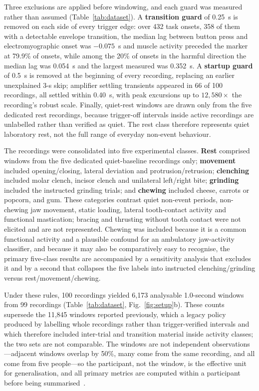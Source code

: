 \documentclass[pdflatex,sn-nature,iicol]{sn-jnl}
\begin{document}
Three exclusions are applied before windowing, and each guard was measured rather than assumed (Table~\ref{tab:dataset}). A \textbf{transition guard} of 0.25~s is removed on each side of every trigger edge: over 432 task onsets, 358 of them with a detectable envelope transition, the median lag between button press and electromyographic onset was $-0.075$~s and muscle activity preceded the marker at 79.9\% of onsets, while among the 20\% of onsets in the harmful direction the median lag was 0.054~s and the largest measured was 0.352~s. A \textbf{startup guard} of 0.5~s is removed at the beginning of every recording, replacing an earlier unexplained 3-s skip; amplifier settling transients appeared in 66 of 100 recordings, all settled within 0.40~s, with peak excursions up to $12{,}580\times$ the recording's robust scale. Finally, quiet-rest windows are drawn only from the five dedicated rest recordings, because trigger-off intervals inside active recordings are unlabelled rather than verified as quiet. The rest class therefore represents quiet laboratory rest, not the full range of everyday non-event behaviour.

The recordings were consolidated into five experimental classes. \textbf{Rest} comprised windows from the five dedicated quiet-baseline recordings only; \textbf{movement} included opening/closing, lateral deviation and protrusion/retrusion; \textbf{clenching} included molar clench, incisor clench and unilateral left/right bite; \textbf{grinding} included the instructed grinding trials; and \textbf{chewing} included cheese, carrots or popcorn, and gum. These categories contrast quiet non-event periods, non-chewing jaw movement, static loading, lateral tooth-contact activity and functional mastication; bracing and thrusting without tooth contact were not elicited and are not represented. Chewing was included because it is a common functional activity and a plausible confound for an ambulatory jaw-activity classifier, and because it may also be comparatively easy to recognise, the primary five-class results are accompanied by a sensitivity analysis that excludes it and by a second that collapses the five labels into instructed clenching/grinding versus rest/movement/chewing.

Under these rules, 100 recordings yielded 6,173 analysable 1.0-second windows from 99 recordings (Table~\ref{tab:dataset}, Fig.~\ref{fig:setup}b). These counts supersede the 11,845 windows reported previously, which a legacy policy produced by labelling whole recordings rather than trigger-verified intervals and which therefore included inter-trial and transition material inside activity classes; the two sets are not comparable. The windows are not independent observations---adjacent windows overlap by 50\%, many come from the same recording, and all come from five people---so the participant, not the window, is the effective unit for generalisation, and all primary metrics are computed within a participant before being summarised~\cite{saeb2017need,little2017using,roberts2017cross}.
\end{document}
